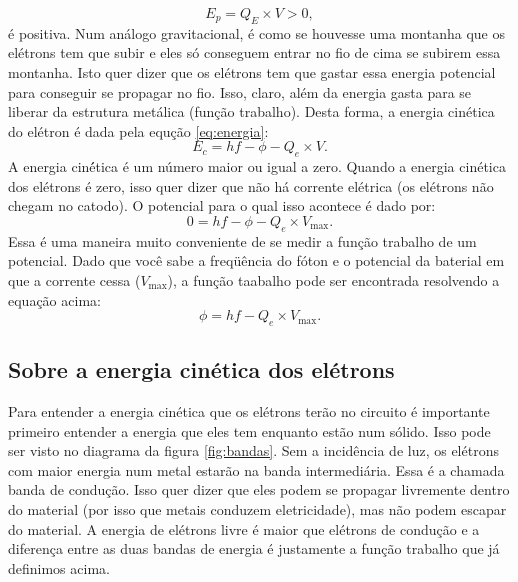\documentclass{article}
\begin{document}
\begin{equation}
E_p = Q_E\times V > 0,
\end{equation}
\'e positiva. Num an\'alogo gravitacional, \'e como se houvesse uma montanha que os el\'etrons tem que subir e eles s\'o conseguem entrar no fio de cima se subirem essa montanha. Isto quer dizer que os el\'etrons tem que gastar essa energia potencial para conseguir se propagar no fio. Isso, claro, al\'em da energia gasta para se liberar da estrutura met\'alica (fun\c c\~ao trabalho). Desta forma, a energia cin\'etica do el\'etron \'e dada pela equ\c c\~ao \eqref{eq:energia}:
\begin{equation}
E_c = hf - \phi - Q_e\times V.
\end{equation}
A energia cin\'ética \'e um n\'umero maior ou igual a zero. Quando a energia cin\'etica dos el\'etrons \'e zero, isso quer dizer que n\~ao h\'a corrente el\'etrica (os el\'etrons n\~ao chegam no catodo). O potencial para o qual isso acontece \'e dado por:
\begin{equation}
0 = hf - \phi - Q_e\times V_{\text{max}}.
\end{equation}
Essa \'e uma maneira muito conveniente de se medir a fun\c c\~ao trabalho de um potencial. Dado que voc\^e sabe a freq\"u\^encia do f\'oton e o potencial da baterial em que a corrente cessa ($V_{\text{max}}$), a fun\c c\~ao taabalho pode ser encontrada resolvendo a equa\c c\~ao acima:
\begin{equation}
\phi = hf - Q_e\times V_{\text{max}}.
\end{equation}

\subsection{Sobre a energia cin\'etica dos el\'etrons}
Para entender a energia cin\'etica que os el\'etrons ter\~ao no circuito \'e importante primeiro entender a energia que eles tem enquanto est\~ao num s\'olido. Isso pode ser visto no diagrama da figura \ref{fig:bandas}. Sem a incid\^encia de luz, os el\'etrons com maior energia num metal estar\~ao na banda intermedi\'aria. Essa \'e a chamada banda de condu\c c\~ao. Isso quer dizer que eles podem se propagar livremente dentro do material (por isso que metais conduzem eletricidade), mas n\~ao podem escapar do material. A energia de el\'etrons livre \'e maior que el\'etrons de condu\c c\~ao e a diferen\c ca entre as duas bandas de energia \'e justamente a fun\c c\~ao trabalho que j\'a definimos acima.
\end{document}
